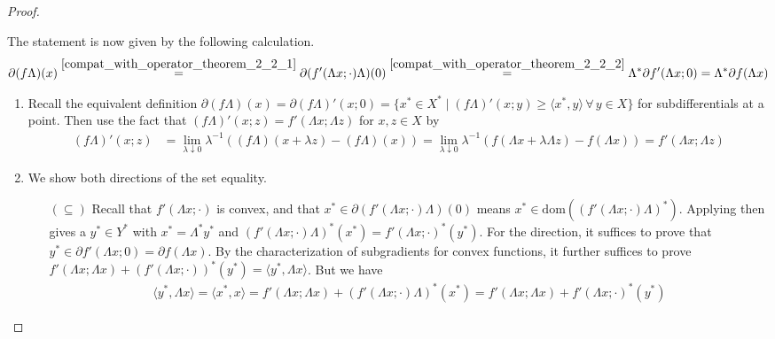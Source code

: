 \documentclass[10pt, leqno]{amsart}
\theoremstyle{definition}
\theoremstyle{remark}
\begin{document}
\begin{proof}
\begin{enumerate}[label=(\roman*), wide]
\begin{enumerate}[label=(\alph*), wide]
                The statement is now given by the following calculation.
                \begin{align}
                    \partial (f\Lambda)(x) \overset{\ref{compat_with_operator_theorem_2_2_1}}{=} \partial (f'(\Lambda x; \cdot)\Lambda)(0) \overset{\ref{compat_with_operator_theorem_2_2_2}}{=} \Lambda^* \partial f'(\Lambda x; 0) = \Lambda^* \partial f(\Lambda x)
                \end{align}
                \begin{enumerate}[label=(\arabic*), wide]
                    \item \label{compat_with_operator_theorem_2_2_1} Recall the equivalent definition \(\partial (f\Lambda)(x) = \partial (f\Lambda)'(x; 0) = \{x^* \in X^* \mid (f\Lambda)'(x; y) \geq \langle x^*, y\rangle \, \forall \, y \in X\}\) for subdifferentials at a point. Then use the fact that \((f\Lambda)'(x; z) = f'(\Lambda x; \Lambda z)\) for \(x, z \in X\) by
                    \begin{align}
                        (f\Lambda)'(x; z) &= \lim_{\lambda \downarrow 0} \lambda^{-1} ((f\Lambda)(x + \lambda z) - (f\Lambda)(x)) = \lim_{\lambda \downarrow 0} \lambda^{-1} (f(\Lambda x + \lambda \Lambda z) - f(\Lambda x)) = f'(\Lambda x; \Lambda z)
                    \end{align}
                    \item \label{compat_with_operator_theorem_2_2_2} We show both directions of the set equality.
                    \begin{itemize}[wide]
                        \item[\((\subseteq)\)] Recall that \(f'(\Lambda x; \cdot)\) is convex, and that \(x^* \in \partial (f'(\Lambda x; \cdot) \Lambda)(0)\) means \(x^* \in \text{dom}((f'(\Lambda x; \cdot)\Lambda)^*)\). Applying  then gives a \(y^* \in Y^*\) with \(x^* = \Lambda^* y^*\) and \((f'(\Lambda x; \cdot)\Lambda)^*(x^*)=f'(\Lambda x; \cdot)^*(y^*)\). For the direction, it suffices to prove that \(y^* \in \partial f'(\Lambda x; 0) = \partial f(\Lambda x)\). By the characterization of subgradients for convex functions, it further suffices to prove \(f'(\Lambda x; \Lambda x) + (f'(\Lambda x; \cdot))^*(y^*) = \langle y^*, \Lambda x \rangle\). But we have
                        \begin{align}
                            \langle y^*, \Lambda x \rangle = \langle x^*, x \rangle = f'(\Lambda x; \Lambda x) + (f'(\Lambda x; \cdot)\Lambda)^*(x^*) = f'(\Lambda x; \Lambda x) + f'(\Lambda x; \cdot)^*(y^*)

\end{align}
\end{itemize}
\end{enumerate}
\end{enumerate}
\end{enumerate}
\end{proof}
\end{document}
